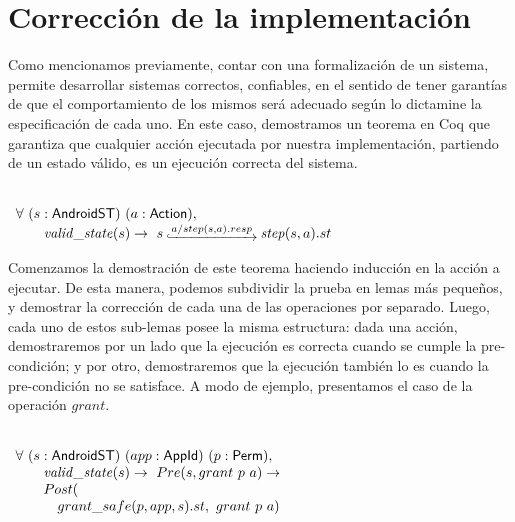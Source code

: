 \section{Corrección de la implementación}
Como mencionamos previamente, contar con una formalización de un sistema, permite desarrollar
sistemas correctos, confiables, en el sentido de tener garantías de que el comportamiento de los
mismos será adecuado según lo dictamine la especificación de cada uno. En este caso, demostramos un
teorema en Coq que garantiza que cualquier acción ejecutada por nuestra implementación, partiendo de
un estado válido, es un ejecución correcta del sistema.


\begin{theorem}
     \label{theorem:soundness} \mbox{} \\
    $ \begin{array}[t]{l} \forall\ (s:\AndroidState)\ (a:\Action), \\
            \quad \quad \ap{valid\_state}{s} \rightarrow\ s\step{a/step(s,a).resp}
            \bap{step}{s}{a}.st                             \\
        \end{array} $
\end{theorem}

Comenzamos la demostración de este teorema haciendo inducción en la acción a ejecutar. De esta
manera, podemos subdividir la prueba en lemas más pequeños, y demostrar la corrección de cada una de
las operaciones por separado. Luego, cada uno de estos sub-lemas posee la misma estructura: dada una
acción, demostraremos por un lado que la ejecución es correcta cuando se cumple la pre-condición; y
por otro, demostraremos que la ejecución también lo es cuando la pre-condición no se satisface. A
modo de ejemplo, presentamos el caso de la operación $grant$.

\begin{lemma}
     \mbox{} \\
    $ \begin{array}[t]{l} \forall\ (s:\AndroidState)\ (app:\AppId)\ (p:\Perm),
            \\
            \quad \quad \ap{valid\_state}{s} \rightarrow\ Pre(s, grant\ p\ a) \rightarrow \\
            \quad \quad Post(                                                             \\
            \quad \quad \quad grant\_safe(p, app, s).st,\ grant\ p\ a)                    \\
        \end{array} $
\end{lemma}

